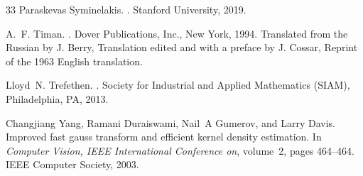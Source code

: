 \begin{thebibliography}{33}
Paraskevas Syminelakis.
.
\newblock Stanford University, 2019.

A.~F. Timan.
.
\newblock Dover Publications, Inc., New York, 1994.
\newblock Translated from the Russian by J. Berry, Translation edited and with
  a preface by J. Cossar, Reprint of the 1963 English translation.

Lloyd~N. Trefethen.
.
\newblock Society for Industrial and Applied Mathematics (SIAM), Philadelphia,
  PA, 2013.

Changjiang Yang, Ramani Duraiswami, Nail~A Gumerov, and Larry Davis.
\newblock Improved fast gauss transform and efficient kernel density
  estimation.
\newblock In {\em Computer Vision, IEEE International Conference on}, volume~2,
  pages 464--464. IEEE Computer Society, 2003.
\end{thebibliography}
